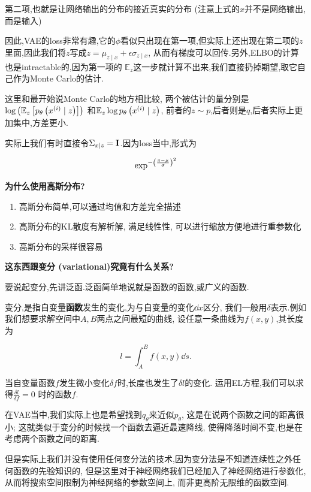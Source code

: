 	第二项,也就是让网络输出的分布的接近真实的分布
	(注意上式的$x$并不是网络输出,而是输入)
	
	因此,VAE的loss非常有趣,它的$\phi$看似只出现在第一项,但实际上还出现在第二项的$z$
	里面,因此我们将$z$写成$z=\mu_{z \mid x}+\epsilon \sigma_{z \mid x}$,
	从而有梯度可以回传.另外,ELBO的计算也是intractable的,因为第一项的
	$\mathbb{E}_{z}$这一步就计算不出来,我们直接扔掉期望,取它自己作为Monte Carlo的估计.
	
	这里和最开始说Monte Carlo的地方相比较,
	两个被估计的量分别是$\log\left( \mathbb{E}_z \left[ p_{\theta} \left( x^{(i)}  \mid z\right)\right]\right)$
	和$\mathbb{E}_{z} \log p_{\theta} \left( x^{(i)}\mid z\right)$,
	前者的$z \sim p$,后者则是$q$,后者实际上更加集中,方差更小.
	
	实际上我们有时直接令$\Sigma_{x \mid z} = \bold{I}$.因为loss当中,形式为

	\begin{equation}
		\exp^{-\left( \frac{x - \mu}{\sigma}\right)^2}
	\end{equation}

	\textbf{为什么使用高斯分布?}
	
	\begin{enumerate}
		\item 高斯分布简单,可以通过均值和方差完全描述
		\item 高斯分布的KL散度有解析解, 满足线性性, 可以进行缩放方便地进行重参数化
		\item 高斯分布的采样很容易
	\end{enumerate}
	
	\textbf{这东西跟变分 (variational)究竟有什么关系?}
	
	要说起变分,先讲泛函.泛函简单地说就是函数的函数,或广义的函数.

	变分,是指自变量\textbf{函数}发生的变化,为与自变量的变化$\dd x$区分,
	我们一般用$\delta$表示.例如我们想要求解空间中$A, B$两点之间最短的曲线,
	设任意一条曲线为$f(x, y)$,其长度为

	\begin{equation}
		l = \int_{A}^{B} f(x,  y) \dd s.
	\end{equation}

	当自变量函数$f$发生微小变化$\delta f$时,长度也发生了$\delta l$的变化.
	运用EL方程,我们可以求得$\frac{\delta l}{\delta f} = 0$
	时的函数$f$.
	
	在VAE当中,我们实际上也是希望找到$q_\theta$来近似$p_{\theta}$,
	这是在说两个函数之间的距离很小;
	这就类似于变分的时候找一个函数去逼近最速降线,
	使得降落时间不变,也是在考虑两个函数之间的距离.

	但是实际上我们并没有使用任何变分法的技术,因为变分法是不知道连续性之外任何函数的先验知识的,
	但是这里对于神经网络我们已经加入了神经网络进行参数化,从而将搜索空间限制为神经网络的参数空间上,
	而非更高阶无限维的函数空间.

